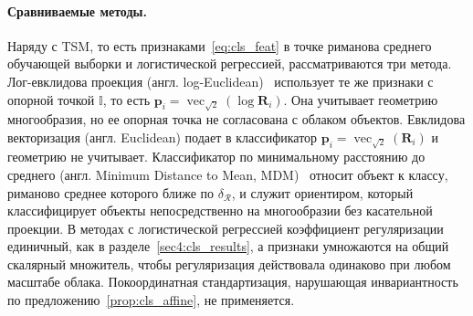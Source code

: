 \paragraph{Сравниваемые методы.} Наряду с TSM, то есть признаками~\eqref{eq:cls_feat} в точке риманова среднего обучающей выборки и логистической регрессией, рассматриваются три метода. Лог-евклидова проекция (англ. log-Euclidean)~\cite{arsigny2007geometric} использует те же признаки с опорной точкой $\mathbb{I}$, то есть $\mathbf{p}_i = \operatorname{vec}_{\sqrt{2}}(\log \mathbf{R}_i)$. Она учитывает геометрию многообразия, но ее опорная точка не согласована с облаком объектов. Евклидова векторизация (англ. Euclidean) подает в классификатор $\mathbf{p}_i = \operatorname{vec}_{\sqrt{2}}(\mathbf{R}_i)$ и геометрию не учитывает. Классификатор по минимальному расстоянию до среднего (англ. Minimum Distance to Mean, MDM)~\cite{barachant2011multiclass} относит объект к классу, риманово среднее которого ближе по $\delta_{\mathcal{R}}$, и служит ориентиром, который классифицирует объекты непосредственно на многообразии без касательной проекции. В методах с логистической регрессией коэффициент регуляризации единичный, как в разделе~\ref{sec4:cls_results}, а признаки умножаются на общий скалярный множитель, чтобы регуляризация действовала одинаково при любом масштабе облака. Покоординатная стандартизация, нарушающая инвариантность по предложению~\ref{prop:cls_affine}, не применяется.

